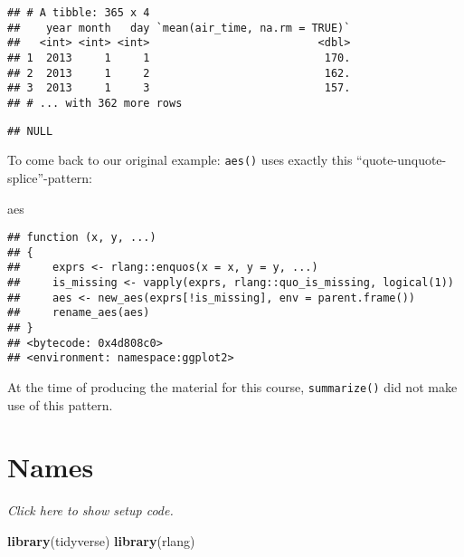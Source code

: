 \documentclass[]{book}
\newenvironment{Shaded}{\begin{snugshade}}{\end{snugshade}}
\newcommand{\KeywordTok}[1]{\textcolor[rgb]{0.13,0.29,0.53}{\textbf{#1}}}
\newcommand{\NormalTok}[1]{#1}
\newcommand{\OperatorTok}[1]{\textcolor[rgb]{0.81,0.36,0.00}{\textbf{#1}}}
\newcommand{\StringTok}[1]{\textcolor[rgb]{0.31,0.60,0.02}{#1}}
\begin{document}
\begin{verbatim}
## # A tibble: 365 x 4
##    year month   day `mean(air_time, na.rm = TRUE)`
##   <int> <int> <int>                          <dbl>
## 1  2013     1     1                           170.
## 2  2013     1     2                           162.
## 3  2013     1     3                           157.
## # ... with 362 more rows
\end{verbatim}

\begin{Shaded}
\end{Shaded}

\begin{verbatim}
## NULL
\end{verbatim}

To come back to our original example: \texttt{aes()} uses exactly this ``quote-unquote-splice''-pattern:

\begin{Shaded}
\begin{Highlighting}[]
\NormalTok{aes}
\end{Highlighting}
\end{Shaded}

\begin{verbatim}
## function (x, y, ...) 
## {
##     exprs <- rlang::enquos(x = x, y = y, ...)
##     is_missing <- vapply(exprs, rlang::quo_is_missing, logical(1))
##     aes <- new_aes(exprs[!is_missing], env = parent.frame())
##     rename_aes(aes)
## }
## <bytecode: 0x4d808c0>
## <environment: namespace:ggplot2>
\end{verbatim}

At the time of producing the material for this course, \texttt{summarize()} did not make use of this pattern.

\hypertarget{named}{%
\section{Names}\label{named}}

\emph{Click here to show setup code.}

\begin{Shaded}
\begin{Highlighting}[]
\KeywordTok{library}\NormalTok{(tidyverse)}
\KeywordTok{library}\NormalTok{(rlang)}
\end{Highlighting}
\end{Shaded}
\end{document}
